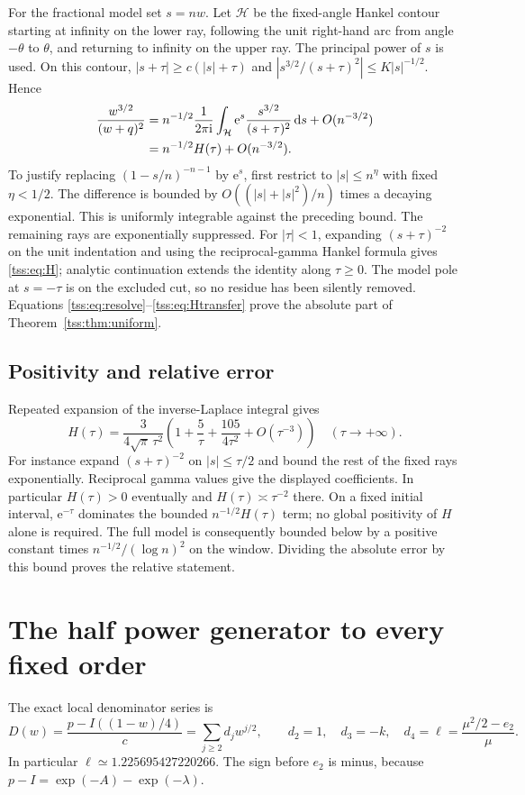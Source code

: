 \documentclass[11pt]{article}
\theoremstyle{remark}\newtheorem{remark}[theorem]{Remark}
\theoremstyle{definition}\newtheorem{definition}[theorem]{Definition}
\newcommand{\ii}{\mathrm i}
\newcommand{\dd}{\mathrm d}
\newcommand{\e}{\mathrm e}
\newcommand{\HH}{\mathcal H}
\begin{document}
For the fractional model set $s=nw$. Let $\HH$ be the fixed-angle Hankel contour starting at infinity on the lower ray, following the unit right-hand arc from angle $-\theta$ to $\theta$, and returning to infinity on the upper ray. The principal power of $s$ is used. On this contour,
$|s+\tau|\geq c(|s|+\tau)$ and
$|s^{3/2}/(s+\tau)^2|\leq K|s|^{-1/2}$. Hence
\begin{align}
[y^n]\frac{w^{3/2}}{(w+q)^2}
 &=n^{-1/2}\frac1{2\pi\ii}\int_{\HH}
       \e^s\frac{s^{3/2}}{(s+\tau)^2}\,\dd s+O(n^{-3/2})\notag\\
 &=n^{-1/2}H(\tau)+O(n^{-3/2}).\label{tss:eq:Htransfer}
\end{align}
To justify replacing $(1-s/n)^{-n-1}$ by $\e^s$, first restrict to $|s|\leq n^\eta$ with fixed $\eta<1/2$. The difference is bounded by $O((|s|+|s|^2)/n)$ times a decaying exponential. This is uniformly integrable against the preceding bound. The remaining rays are exponentially suppressed. For $|\tau|<1$, expanding $(s+\tau)^{-2}$ on the unit indentation and using the reciprocal-gamma Hankel formula gives \eqref{tss:eq:H}; analytic continuation extends the identity along $\tau\geq0$. The model pole at $s=-\tau$ is on the excluded cut, so no residue has been silently removed. Equations \eqref{tss:eq:resolve}--\eqref{tss:eq:Htransfer} prove the absolute part of Theorem~\ref{tss:thm:uniform}.

\subsection{Positivity and relative error}
Repeated expansion of the inverse-Laplace integral gives
\begin{equation}\label{tss:eq:Hlarge}
H(\tau)=\frac3{4\sqrt\pi\,\tau^2}
 \left(1+\frac5\tau+\frac{105}{4\tau^2}+O(\tau^{-3})\right)
 \quad(\tau\to+\infty).
\end{equation}
For instance expand $(s+\tau)^{-2}$ on $|s|\leq\tau/2$ and bound the rest of the fixed rays exponentially. Reciprocal gamma values give the displayed coefficients. In particular $H(\tau)>0$ eventually and $H(\tau)\asymp\tau^{-2}$ there. On a fixed initial interval, $\e^{-\tau}$ dominates the bounded $n^{-1/2}H(\tau)$ term; no global positivity of $H$ alone is required. The full model is consequently bounded below by a positive constant times $n^{-1/2}/(\log n)^2$ on the window. Dividing the absolute error by this bound proves the relative statement.

\section{The half power generator to every fixed order}
\label{tss:sec:allorders}
The exact local denominator series is
\begin{equation}\label{tss:eq:D}
D(w)=\frac{p-I((1-w)/4)}{c}=\sum_{j\geq2}d_jw^{j/2},\qquad
 d_2=1,\quad d_3=-k,\quad
 d_4=\ell=\frac{\mu^2/2-e_2}{\mu}.
\end{equation}
In particular $\ell\simeq1.225695427220266$. The sign before $e_2$ is minus, because
$p-I=\exp(-A)-\exp(-\lambda)$.
\end{document}
